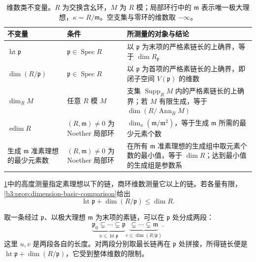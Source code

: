\begin{table}[htbp]
	\centering
	\caption[维数类不变量]{维数类不变量。\(R\) 为交换含幺环，\(M\) 为 \(R\) 模；局部环行中的 \(\mathfrak m\) 表示唯一极大理想，\(\kappa=R/\mathfrak m\)。空支集与零环的维数取 \(-\infty\)。}
	\label{b3:tab:dimension-invariants}
	\begin{tabularx}{\textwidth}{@{}>{\raggedright\arraybackslash}p{}>{\raggedright\arraybackslash}p{}>{\raggedright\arraybackslash}X@{}}
		\toprule
		不变量 & 条件 & 所测量的对象与结论\\
		\midrule
		\(\operatorname{ht}\mathfrak p\) & \(\mathfrak p\in\operatorname{Spec}R\) & 以 \(\mathfrak p\) 为末项的严格素链长的上确界，等于 \(\dim R_{\mathfrak p}\)\\
		\(\dim(R/\mathfrak p)\) & \(\mathfrak p\in\operatorname{Spec}R\) & 以 \(\mathfrak p\) 为首项的严格素链长的上确界，即闭子空间 \(V(\mathfrak p)\) 的维数\\
		\(\dim_R M\) & 任意 \(R\) 模 \(M\) & 支集 \(\operatorname{Supp}_R M\) 内的严格素链长的上确界；若 \(M\) 有限生成，等于 \(\dim(R/\operatorname{Ann}_R M)\)\\
		\(\operatorname{edim}R\) & \((R,\mathfrak m)\ne0\) 为 Noether 局部环 & \(\dim_\kappa(\mathfrak m/\mathfrak m^2)\)，等于生成 \(\mathfrak m\) 所需的最少元素个数\\
		生成 \(\mathfrak m\) 准素理想的最少元素数 & \((R,\mathfrak m)\ne0\) 为 Noether 局部环 & 在所有 \(\mathfrak m\) 准素理想的生成组中取元素个数的最小值，等于 \(\dim R\)；达到最小值的生成组是参数系\\
		\bottomrule
	\end{tabularx}
\end{table}

\cref{b3:tab:dimension-invariants}中的高度测量指定素理想以下的链，商环维数测量它以上的链。若各量有限，\cref{b3:prop:dimension-basic-comparison}给出
\[
	\operatorname{ht}\mathfrak p+\dim(R/\mathfrak p)\le\dim R.
\]
\begin{samepage}
	取一条经过 \(\mathfrak p\)、以极大理想 \(\mathfrak m\) 为末项的素链，可以在 \(\mathfrak p\) 处分成两段：
	\[
		\underbrace{\mathfrak p_0\subsetneq\cdots\subsetneq\mathfrak p} _{u\le\operatorname{ht}\mathfrak p} \underbrace{\subsetneq\cdots\subsetneq\mathfrak m} _{v\le\dim(R/\mathfrak p)}.
	\]
	这里 \(u,v\) 是两段各自的长度。对两段分别取最长链再在 \(\mathfrak p\) 处拼接，所得链长便是 \(\operatorname{ht}\mathfrak p+\dim(R/\mathfrak p)\)，它受到整体维数的限制。
\end{samepage}
